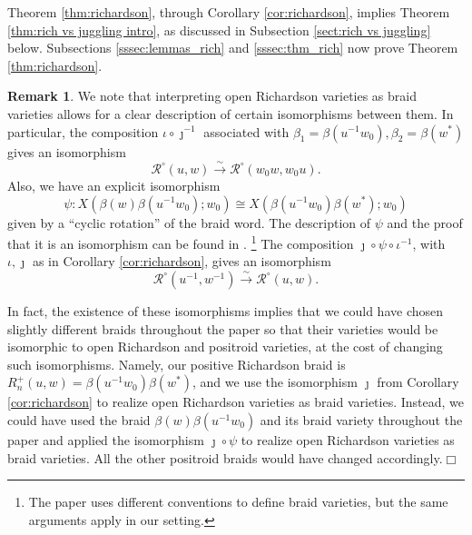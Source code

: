 \documentclass[10pt]{amsart}
\theoremstyle{plain}
\theoremstyle{definition}
\newtheorem{remark}[thm]{Remark}
\theoremstyle{remark}
\numberwithin{equation}{section}
\newcommand{\rich}[2]{\mathcal{R}^{\circ}\!(#2,#1)}
\begin{document}
\noindent Theorem \ref{thm:richardson}, through Corollary \ref{cor:richardson}, implies Theorem \ref{thm:rich vs juggling intro}, as discussed in Subsection \ref{sect:rich vs juggling} below. Subsections \ref{sssec:lemmas_rich} and \ref{sssec:thm_rich} now prove Theorem \ref{thm:richardson}.


\begin{remark}
\label{rem:different isomorphisms}
We note that interpreting open Richardson varieties as braid varieties allows for a clear description of certain isomorphisms between them.
In particular, 
the composition $\iota \circ \jmath^{-1}$ associated with $\beta_1 = \beta(u^{-1}w_0), \beta_2 = \beta(w^*)$ gives an isomorphism
\[
\rich{w}{u} \overset\sim\to \rich{w_0 u}{w_0 w}.
\]
Also, we have an explicit isomorphism 
\[
\psi: X(\beta(w)\beta(u^{-1}w_0); w_{0}) \cong X(\beta(u^{-1}w_0)\beta(w^*); w_0)
\]
given by a ``cyclic rotation'' of the braid word. The description of $\psi$ and the proof that it is an isomorphism can be found in \cite[Lemma 3.10]{cgglss}. \footnote{The paper \cite{cgglss} uses different conventions to define braid varieties, but the same arguments apply in our setting.} 
The composition 
$\jmath \circ \psi \circ \iota^{-1}$, with $\iota, \jmath$ as in Corollary \ref{cor:richardson}, gives an isomorphism
\[
\rich{w^{-1}}{u^{-1}} \overset\sim\to \rich{w}{u}.
\]

In fact, the existence of these isomorphisms implies that we could have chosen slightly different braids throughout the paper so that their varieties would be isomorphic to open Richardson and positroid varieties, at the cost of changing such isomorphisms. Namely, our positive Richardson braid is $R^+_n(u, w) = \beta(u^{-1}w_0)\beta(w^*)$, and we use the isomorphism $\jmath$ from Corollary \ref{cor:richardson} to realize open Richardson varieties as braid varieties. Instead, we could have used the braid $\beta(w)\beta(u^{-1}w_0)$ and its braid variety throughout the paper and applied the isomorphism $\jmath \circ \psi$ to realize open Richardson varieties as braid varieties. All the other positroid braids would have changed accordingly.\hfill$\Box$
\end{remark}
\end{document}
